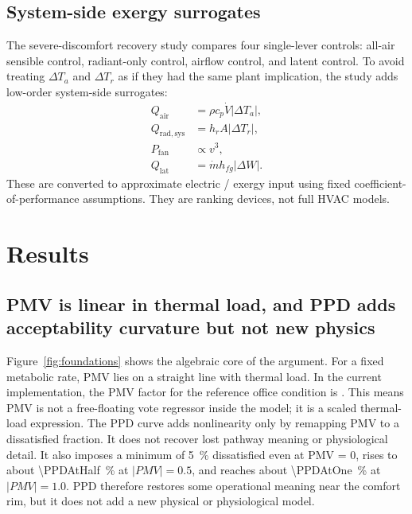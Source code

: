 \documentclass[preprint,authoryear,12pt]{elsarticle}
\begin{document}


\subsection{System-side exergy surrogates}

The severe-discomfort recovery study compares four single-lever controls: all-air sensible control, radiant-only control, airflow control, and latent control. To avoid treating $\Delta T_a$ and $\Delta T_r$ as if they had the same plant implication, the study adds low-order system-side surrogates:
\begin{align}
Q_{\mathrm{air}} &= \rho c_p \dot{V} |\Delta T_a|, \\
Q_{\mathrm{rad,sys}} &= h_r A |\Delta T_r|, \\
P_{\mathrm{fan}} &\propto v^3, \\
Q_{\mathrm{lat}} &= \dot{m} h_{fg} |\Delta W|.
\end{align}
These are converted to approximate electric / exergy input using fixed coefficient-of-performance assumptions. They are ranking devices, not full HVAC models.



\section{Results}

\subsection{PMV is linear in thermal load, and PPD adds acceptability curvature but not new physics}

Figure~\ref{fig:foundations} shows the algebraic core of the argument. For a fixed metabolic rate, PMV lies on a straight line with thermal load. In the current implementation, the PMV factor for the reference office condition is \ReferencePMVFactor. This means PMV is not a free-floating vote regressor inside the model; it is a scaled thermal-load expression. The PPD curve adds nonlinearity only by remapping PMV to a dissatisfied fraction. It does not recover lost pathway meaning or physiological detail. It also imposes a minimum of \SI{5}{\percent} dissatisfied even at PMV = 0, rises to about \SI{\PPDAtHalf}{\percent} at $|PMV| = 0.5$, and reaches about \SI{\PPDAtOne}{\percent} at $|PMV| = 1.0$. PPD therefore restores some operational meaning near the comfort rim, but it does not add a new physical or physiological model.
\end{document}
